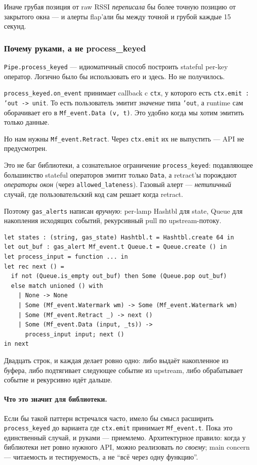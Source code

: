 Иначе грубая позиция от raw RSSI \emph{переписала} бы более точную
позицию от закрытого окна --- и алерты flap'али бы между точной и
грубой каждые 15 секунд.

\subsubsection{Почему руками, а не process\_keyed}

\texttt{Pipe.process\_keyed} --- идиоматичный способ построить
stateful per-key оператор. Логично было бы использовать его и
здесь. Но не получилось.

\texttt{process\_keyed.on\_event} принимает callback c \texttt{ctx},
у которого есть \texttt{ctx.emit : 'out -> unit}. То есть пользователь
эмитит \emph{значение} типа \texttt{'out}, а runtime сам оборачивает
его в \texttt{Mf\_event.Data (v, t)}. Это удобно когда мы хотим
эмитить только данные.

Но нам нужны \texttt{Mf\_event.Retract}. Через \texttt{ctx.emit} их
не выпустить --- API не предусмотрен.

Это не баг библиотеки, а сознательное ограничение
\texttt{process\_keyed}: подавляющее большинство stateful операторов
эмитит только \texttt{Data}, а retract'ы порождают \emph{операторы
окон} (через \texttt{allowed\_lateness}). Газовый алерт ---
\emph{нетипичный} случай, где пользовательский код сам решает когда
retract.

Поэтому \texttt{gas\_alerts} написан \emph{вручную}: per-lamp Hashtbl
для state, Queue для накопления исходящих событий, рекурсивный pull
по upstream-потоку.

\begin{lstlisting}
let states : (string, gas_state) Hashtbl.t = Hashtbl.create 64 in
let out_buf : gas_alert Mf_event.t Queue.t = Queue.create () in
let process_input = function ... in
let rec next () =
  if not (Queue.is_empty out_buf) then Some (Queue.pop out_buf)
  else match unioned () with
    | None -> None
    | Some (Mf_event.Watermark wm) -> Some (Mf_event.Watermark wm)
    | Some (Mf_event.Retract _) -> next ()
    | Some (Mf_event.Data (input, _ts)) ->
      process_input input; next ()
in next
\end{lstlisting}

Двадцать строк, и каждая делает ровно одно: либо выдаёт накопленное
из буфера, либо подтягивает следующее событие из upstream, либо
обрабатывает событие и рекурсивно идёт дальше.

\paragraph{Что это значит для библиотеки.} Если бы такой паттерн
встречался часто, имело бы смысл расширить \texttt{process\_keyed}
до варианта где \texttt{ctx.emit} принимает \texttt{Mf\_event.t}.
Пока это единственный случай, и руками --- приемлемо. Архитектурное
правило: когда у библиотеки нет ровно нужного API, можно реализовать
\emph{по своему}; main concern --- читаемость и тестируемость, а не
``всё через одну функцию''.

